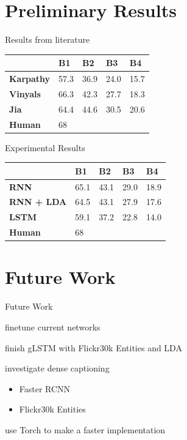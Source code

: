 \documentclass[16pt]{beamer}
\newenvironment{wideitemize}{\itemize\addtolength{\itemsep}{10pt}}{\enditemize}
\begin{document}
\section{Preliminary Results}%
\begin{frame}{Results from literature}
\begin{table}[]
\centering
\begin{tabular}{lllll}
                  & \textbf{B1} & \textbf{B2} & \textbf{B3} & \textbf{B4} \\ \hline
\textbf{Karpathy} & 57.3        & 36.9        & 24.0        & 15.7             \\
\textbf{Vinyals}  & 66.3        & 42.3        & 27.7        & 18.3        \\
\textbf{Jia}      & 64.4        & 44.6        & 30.5        & 20.6        \\
\textbf{Human}    & 68          &             &             &             \\ \hline
\end{tabular}
\end{table}

\end{frame}
\begin{frame}{Experimental Results}
\begin{table}[]
\centering
\begin{tabular}{lllll}
\multicolumn{1}{c}{}    & \textbf{B1} & \textbf{B2} & \textbf{B3} & \textbf{B4} \\ \hline
\textbf{RNN}       & 65.1        & 43.1        & 29.0        & 18.9        \\
\textbf{RNN + LDA} & 64.5        & 43.1        & 27.9        & 17.6        \\
\textbf{LSTM}        & 59.1        & 37.2        & 22.8        & 14.0        \\
\textbf{Human}          & 68          &             &             &             \\ \hline
\end{tabular}
\end{table}

\end{frame}

\section{Future Work}
\begin{frame}{Future Work}
\begin{wideitemize}
\item finetune current networks
\item finish gLSTM with Flickr30k Entities and LDA
\item investigate dense captioning
\begin{itemize}
    \item Faster RCNN
    \item Flickr30k Entities
\end{itemize}
\item use Torch to make a faster implementation
\end{wideitemize}

\end{frame}
\end{document}
